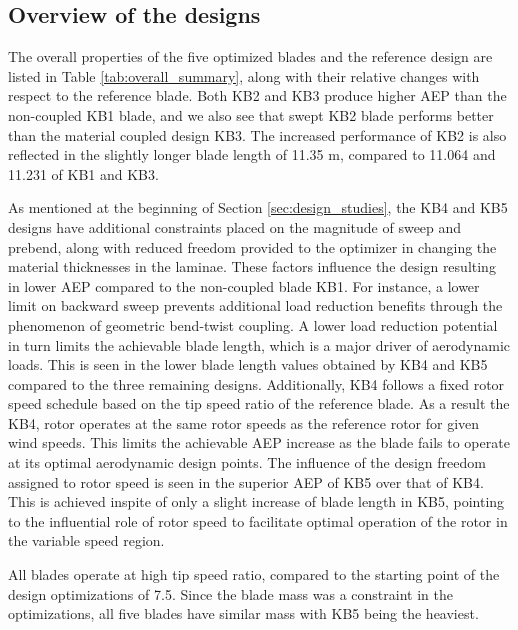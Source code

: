 \subsection{Overview of the designs}
\label{subsec:design_overview}
The overall properties of the five optimized blades and the reference design are listed in Table \ref{tab:overall_summary}, along with their relative changes with respect to the reference blade.
Both KB2 and KB3 produce higher AEP than the non-coupled KB1 blade, and we also see that swept KB2 blade performs better than the material coupled design KB3. The increased performance of KB2 is also reflected in the slightly longer blade length of 11.35 m, compared to 11.064 and 11.231 of KB1 and KB3.


As mentioned at the beginning of Section \ref{sec:design_studies}, the KB4 and KB5 designs have additional constraints placed on the magnitude of sweep and prebend, along with reduced freedom provided to the optimizer in changing the material thicknesses in the laminae. These factors influence the design resulting in lower AEP compared to the non-coupled blade KB1. For instance, a lower limit on backward sweep prevents additional load reduction benefits through the phenomenon of geometric bend-twist coupling. A lower load reduction potential in turn limits the achievable blade length, which is a major driver of aerodynamic loads. This is seen in the lower blade length values obtained by KB4 and KB5 compared to the three remaining designs. Additionally, KB4 follows a fixed rotor speed schedule based on the tip speed ratio of the reference blade. As a result the KB4, rotor operates at the same rotor speeds as the reference rotor for given wind speeds. This limits the achievable AEP increase as the blade fails to operate at its optimal aerodynamic design points. The influence of the design freedom assigned to rotor speed is seen in the superior AEP of KB5 over that of KB4. This is achieved inspite of only a slight increase of blade length in KB5, pointing to the influential role of rotor speed to facilitate optimal operation of the rotor in the variable speed region.

All blades operate at high tip speed ratio, compared to the starting point of the design optimizations of 7.5. Since the blade mass was a constraint in the optimizations, all five blades have similar mass with KB5 being the heaviest.

